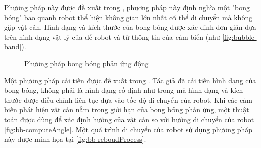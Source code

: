 Phương pháp này được đề xuất trong \cite{Quinlan1993}, phương pháp này định nghĩa một "bong bóng" bao quanh robot thể hiện không gian lớn nhất có thể di chuyển mà không gặp vật cản. Hình dạng và kích thước của bong bóng được xác định đơn giản dựa trên hình dạng vật lý của đế robot và từ thông tin của cảm biến (như \figurename{\ref{fig:bubble-band}}).

\begin{figure}
	\centering
	\hspace{8pt}
	\caption{Phương pháp bong bóng phản ứng động}
	\label{fig:bubbleRebound}
\end{figure}

Một phương pháp cải tiến được đề xuất trong \cite{Susnea2010}. Tác giả đã cải tiến hình dạng của bong bóng, không phải là hình dạng cố định như trong \cite{Quinlan1993} mà hình dạng và kích thước được điều chỉnh liên tục dựa vào tốc độ di chuyển của robot. Khi các cảm biến phát hiện vật cản nằm trong giới hạn của bong bóng phản ứng, một thuật toán được dùng để xác định hướng của vật cản so với hướng di chuyển của robot \figurename{\ref{fig:bb-computeAngle}}. Một quá trình di chuyển của robot sử dụng phương pháp này được minh họa tại \figurename{\ref{fig:bb-reboudProcess}}.

